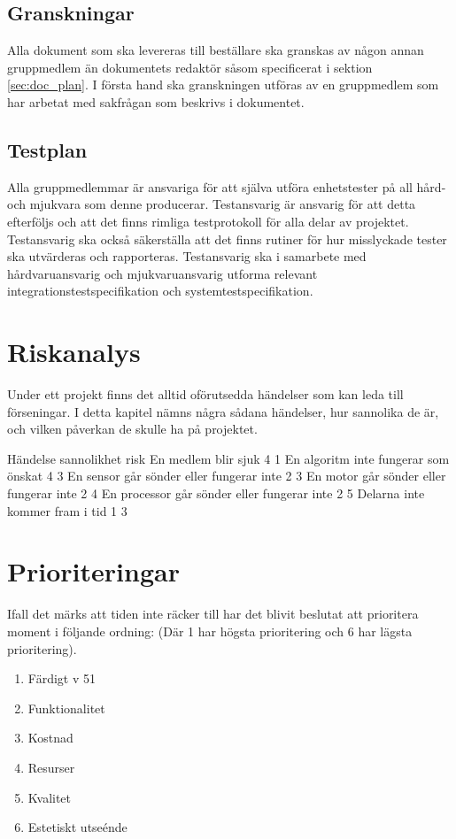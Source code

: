\documentclass[a4paper,11pt]{article}
\begin{document}
\subsection{Granskningar}
Alla dokument som ska levereras till beställare ska granskas av någon annan gruppmedlem än dokumentets redaktör såsom specificerat i sektion \ref{sec:doc_plan}. I första hand ska granskningen utföras av en gruppmedlem som har arbetat med sakfrågan som beskrivs i dokumentet.

\subsection{Testplan}
Alla gruppmedlemmar är ansvariga för att själva utföra enhetstester på all hård- och mjukvara som denne producerar. Testansvarig är ansvarig för att detta efterföljs och att det finns rimliga testprotokoll för alla delar av projektet. Testansvarig ska också säkerställa att det finns rutiner för hur misslyckade tester ska utvärderas och rapporteras. Testansvarig ska i samarbete med hårdvaruansvarig och mjukvaruansvarig utforma relevant integrationstestspecifikation och systemtestspecifikation.

\section{Riskanalys}
Under ett projekt finns det alltid oförutsedda händelser som kan leda till förseningar. I detta kapitel nämns några sådana händelser, hur sannolika de är, och vilken påverkan de skulle ha på projektet.

Händelse sannolikhet risk
En medlem blir sjuk 4 1
En algoritm inte fungerar som önskat 4 3
En sensor går sönder eller fungerar inte 2 3
En motor går sönder eller fungerar inte 2 4
En processor går sönder eller fungerar inte 2 5
Delarna inte kommer fram i tid 1 3


\section{Prioriteringar}
Ifall det märks att tiden inte räcker till har det blivit beslutat att prioritera moment i följande ordning: (Där 1 har högsta prioritering och 6 har lägsta prioritering).

\begin{enumerate}
        \item Färdigt v 51
        \item Funktionalitet %
        \item Kostnad %
        \item Resurser %
        \item Kvalitet %
        \item Estetiskt utseénde
    \end{enumerate}
\end{document}
